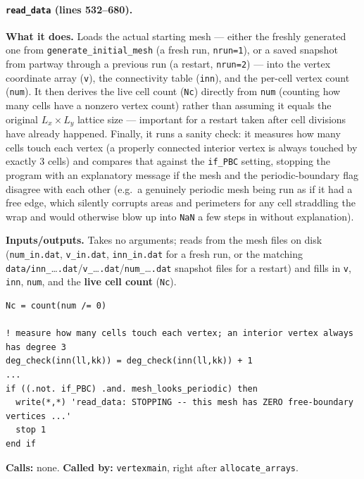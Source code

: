 \documentclass[11pt]{article}
\begin{document}
\paragraph{\texttt{read\_data} (lines 532--680).}
\textbf{What it does.} Loads the actual starting mesh --- either the freshly generated
one from \texttt{generate\_initial\_mesh} (a fresh run, \texttt{nrun=1}), or a saved
snapshot from partway through a previous run (a restart, \texttt{nrun=2}) --- into the
vertex coordinate array (\texttt{v}), the connectivity table (\texttt{inn}), and the
per-cell vertex count (\texttt{num}). It then derives the live cell count (\texttt{Nc})
directly from \texttt{num} (counting how many cells have a nonzero vertex count) rather
than assuming it equals the original $L_x \times L_y$ lattice size --- important for a
restart taken after cell divisions have already happened. Finally, it runs a sanity
check: it measures how many cells touch each vertex (a properly connected interior
vertex is always touched by exactly 3 cells) and compares that against the
\texttt{if\_PBC} setting, stopping the program with an explanatory message if the mesh
and the periodic-boundary flag disagree with each other (e.g.\ a genuinely periodic
mesh being run as if it had a free edge, which silently corrupts areas and perimeters
for any cell straddling the wrap and would otherwise blow up into \texttt{NaN} a few
steps in without explanation).

\textbf{Inputs/outputs.} Takes no arguments; reads from the mesh files on disk
(\texttt{num\_in.dat}, \texttt{v\_in.dat}, \texttt{inn\_in.dat} for a fresh run, or the
matching \texttt{data/inn\_}\dots\texttt{.dat}/\texttt{v\_}\dots\texttt{.dat}/\texttt{num\_}\dots\texttt{.dat}
snapshot files for a restart) and fills in \texttt{v}, \texttt{inn}, \texttt{num}, and
the \textbf{live cell count} (\texttt{Nc}).

\begin{lstlisting}[caption={Deriving the live cell count from the loaded mesh, and the periodicity sanity check.}]
Nc = count(num /= 0)

! measure how many cells touch each vertex; an interior vertex always has degree 3
deg_check(inn(ll,kk)) = deg_check(inn(ll,kk)) + 1
...
if ((.not. if_PBC) .and. mesh_looks_periodic) then
  write(*,*) 'read_data: STOPPING -- this mesh has ZERO free-boundary vertices ...'
  stop 1
end if
\end{lstlisting}

\textbf{Calls:} none. \textbf{Called by:} \texttt{vertexmain}, right after \texttt{allocate\_arrays}.
\end{document}
